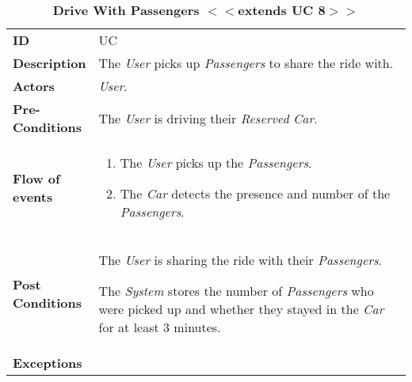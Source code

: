 \begin{longtable}{|p{0.2\linewidth} p{0.8\linewidth}|}
	\captionsetup{labelformat=empty} %
	\caption{\textbf{Drive With Passengers $<<$extends UC 8$>>$}} %
	\label{UC_DriveWithPassengers}%
	\\ \hline %
	
	\textbf{ID} & UC\theUseCaseIdCounter \\ \hline
	\textbf{Description} & The \emph{User} picks up \emph{Passengers} to share the ride with. \\ \hline
	\textbf{Actors} & \emph{User}.\\ \hline
	\textbf{Pre-Conditions} & The \emph{User} is driving their \emph{Reserved} \emph{Car}. \\ \hline
	\textbf{Flow of events} & 
	\begin{enumerate}
		\item The \emph{User} picks up the \emph{Passengers}.
		\item The \emph{Car} detects the presence and number of the \emph{Passengers}.
	\end{enumerate}	 \\ \hline
	\textbf{Post Conditions} & The \emph{User} is sharing the ride with their \emph{Passengers}.
	
	The \emph{System} stores the number of \emph{Passengers} who were picked up and whether they stayed in the \emph{Car} for at least 3 minutes.\\ \hline
	\textbf{Exceptions} & \\ \hline
\end{longtable}

